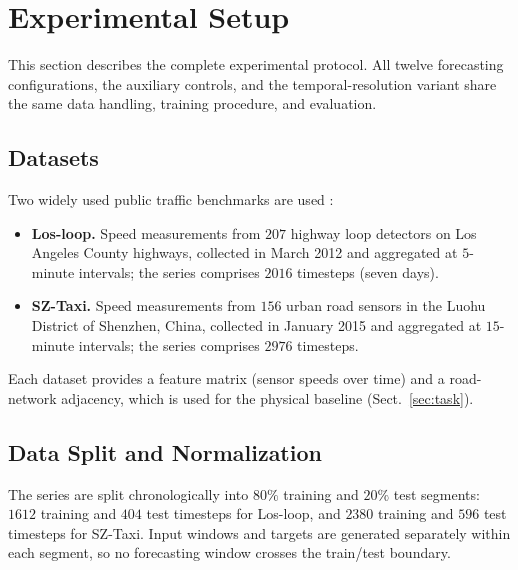 \section{Experimental Setup}\label{sec:setup}

This section describes the complete experimental protocol. All twelve
forecasting configurations, the auxiliary controls, and the temporal-resolution
variant share the same data handling, training procedure, and evaluation.

\subsection{Datasets}\label{sec:datasets}

Two widely used public traffic benchmarks are used
\citep{zhao2019t}:

\begin{itemize}
\item \textbf{Los-loop.} Speed measurements from $207$ highway loop detectors
on Los Angeles County highways, collected in March 2012 and aggregated at
$5$-minute intervals; the series comprises $2016$ timesteps (seven days).
\item \textbf{SZ-Taxi.} Speed measurements from $156$ urban road sensors in
the Luohu District of Shenzhen, China, collected in January 2015 and
aggregated at $15$-minute intervals; the series comprises $2976$ timesteps.
\end{itemize}

Each dataset provides a feature matrix (sensor speeds over time) and a
road-network adjacency, which is used for the physical baseline
(Sect.~\ref{sec:task}).

\subsection{Data Split and Normalization}\label{sec:split}

The series are split chronologically into $80\%$ training and $20\%$ test
segments: $1612$ training and $404$ test timesteps for Los-loop, and $2380$
training and $596$ test timesteps for SZ-Taxi. Input windows and targets are
generated separately within each segment, so no forecasting window crosses
the train/test boundary.


